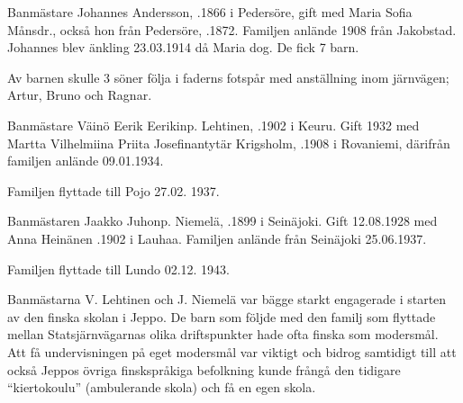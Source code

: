 {Banmästare Johannes Andersson, .1866 i Pedersöre, gift med Maria Sofia Månsdr., också hon från Pedersöre, .1872. Familjen anlände 1908 från Jakobstad. Johannes blev änkling 23.03.1914 då Maria dog. De fick 7 barn.
\begin{jhchildren}
  \item {}
  \item {}
  \item {}
  \item {}
  \item {}
  \item {}
  \item {}
\end{jhchildren}
Av barnen skulle 3 söner följa i faderns fotspår med anställning inom järnvägen; Artur, Bruno och Ragnar.


Banmästare Väinö Eerik Eerikinp. Lehtinen, .1902 i Keuru. Gift 1932 med Martta Vilhelmiina Priita Josefinantytär Krigsholm, .1908 i Rovaniemi, därifrån familjen anlände 09.01.1934.
\begin{jhchildren}
  \item {}
  \item {}
\end{jhchildren}
Familjen flyttade till Pojo 27.02. 1937.


Banmästaren Jaakko Juhonp. Niemelä, .1899 i Seinäjoki. Gift 12.08.1928 med Anna Heinänen .1902 i Lauhaa. Familjen anlände från Seinäjoki 25.06.1937.
\begin{jhchildren}
  \item {}
  \item {}
\end{jhchildren}
Familjen flyttade till  Lundo 02.12. 1943.


Banmästarna V. Lehtinen och J. Niemelä var bägge starkt engagerade i starten av den finska skolan i Jeppo. De barn som följde med den familj som flyttade mellan Statsjärnvägarnas olika driftspunkter hade ofta finska som modersmål. Att få undervisningen på eget modersmål var viktigt och bidrog samtidigt till att också Jeppos övriga finskspråkiga befolkning kunde frångå den tidigare ``kiertokoulu'' (ambulerande skola) och få en egen skola.


}
